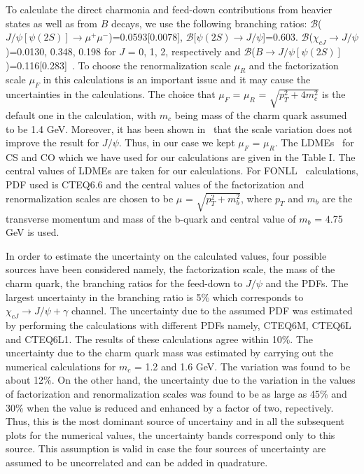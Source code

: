 \documentclass{iopart}
\begin{document}
To calculate the direct charmonia and feed-down contributions from heavier states as well as from $B$ decays, we use the following branching ratios:
$\mathcal{B}$($J/\psi[\psi(2S)]\rightarrow \mu^{+}\mu^{-}$)=0.0593[0.0078], 
$\mathcal{B}$[$\psi(2S)\rightarrow J/\psi$]=0.603. 
$\mathcal{B}$($\chi_{cJ}\rightarrow J/\psi$)=0.0130, 0.348, 0.198 for $J$ = 0, 1, 2, respectively and
$\mathcal{B}$($B\rightarrow J/\psi[\psi(2S)]$)=0.116[0.283]~\cite{prd86}. To choose the renormalization scale $\mu_{R}$ and the factorization scale $\mu_F$ in this calculations is an important issue and it may cause the uncertainties in the calculations. The choice that $\mu_{F}$ = $\mu_{R}$ = $\sqrt{p_T^2 + 4m_c^2}$ is the default one in the calculation, with $m_c$ being mass of the charm quark assumed to be 1.4 GeV. Moreover, it has been shown in~\cite{prd78} that the scale variation does not improve the result for $J/\psi$. Thus, in our case we kept $\mu_{F}$ = $\mu_{R}$. 
The LDMEs~\cite{prc87} for CS and CO which we have used for our calculations are given in the Table I. The central values of LDMEs are taken for our calculations. For FONLL~\cite{jhep9805,jhep0103,cacci} calculations, PDF used is CTEQ6.6 and the central values of the factorization and renormalization scales are chosen to be $\mu$ = $\sqrt{p_T^2 + m_b^2}$, where $p_T$ and $m_b$ are the transverse momentum and mass of the b-quark and central value of $m_b$ = 4.75 GeV is used.


In order to estimate the uncertainty on the calculated values, four possible sources have been considered namely, the factorization scale, the mass of the charm quark, the branching ratios for the feed-down to $J/\psi$ and the PDFs. The largest uncertainty in the branching ratio is 5\% which corresponds to $\chi_{cJ}\rightarrow J/\psi + \gamma$ channel. The uncertainty due to the assumed PDF was estimated by performing the calculations with different PDFs namely, CTEQ6M, CTEQ6L and CTEQ6L1. The results of these calculations agree within 10\%. The uncertainty due to the charm quark mass was estimated by carrying out the numerical calculations for $m_c$ = 1.2 and 1.6 GeV. The variation was found to be about 12\%. On the other hand, the uncertainty due to the variation in the values of factorization and renormalization scales was found to be as large as 45\% and 30\% when the value is reduced and enhanced by a factor of two, repectively. Thus, this is the most dominant source of uncertainy and in all the subsequent plots for the numerical values, the uncertainty bands correspond only to this source. This assumption is valid in case the four sources of uncertainty are assumed to be uncorrelated and can be added in quadrature.
\end{document}
